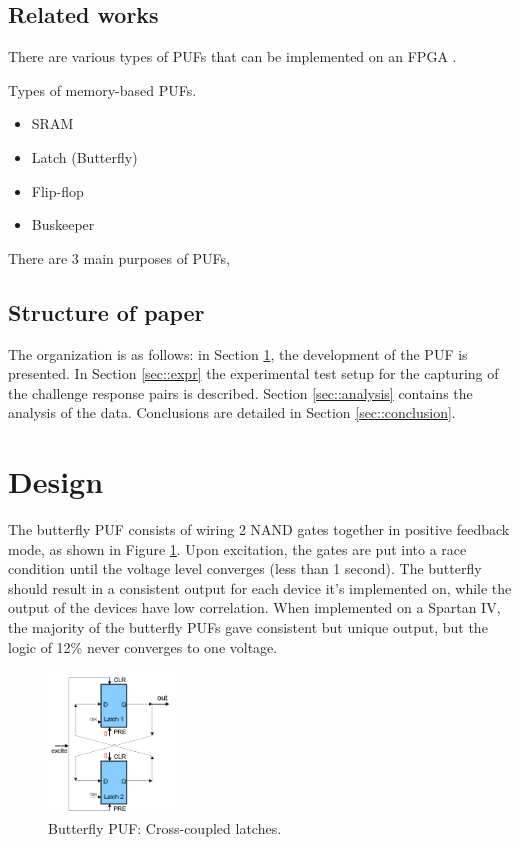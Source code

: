 \subsection{Related works}

	There are various types of PUFs that can be implemented on an FPGA \cite{VanHerrewege2015}. 

	\cite{VanHerrewege2015} 
	Types of memory-based PUFs.
		\begin{itemize}
			\item SRAM 
			\item Latch (Butterfly) 	\cite{Kumar2008}
			\item Flip-flop \cite{Maes2008,Leest2010}
			\item Buskeeper \cite{Simons2012}
		\end{itemize}

	There are 3 main purposes of PUFs, 
\subsection{Structure of paper}
	The organization is as follows: in Section \ref{sec::des_impl}, the development of the PUF is presented.  In Section \ref{sec::expr} the experimental test setup for the capturing of the challenge response pairs is described. Section \ref{sec::analysis} contains the analysis of the data. Conclusions are detailed in Section \ref{sec::conclusion}. 


\section{Design} \label{sec::des_impl}
	The butterfly PUF consists of wiring 2 NAND gates together in positive feedback mode, as shown in Figure \ref{fig:bfly}. Upon excitation, the gates are put into a race condition until the voltage level converges (less than 1 second). The butterfly should result in a consistent output for each device it's implemented on, while the output of the devices have low correlation. When implemented on a Spartan IV, the majority of the butterfly PUFs gave consistent but unique output, but the logic of 12\% never converges to one voltage. 
		\begin{figure}[tbph]
			\centering
			\includegraphics[width=0.3\textwidth]{bfly.png}
			\caption{Butterfly PUF: Cross-coupled latches.}\label{fig:bfly}
		\end{figure}

